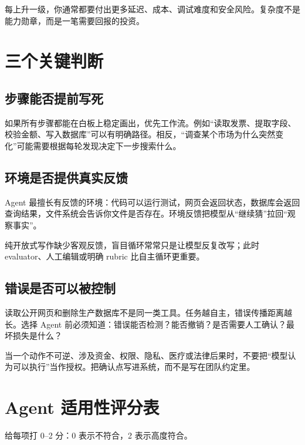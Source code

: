 每上升一级，你通常都要付出更多延迟、成本、调试难度和安全风险。复杂度不是能力勋章，而是一笔需要回报的投资。

\section{三个关键判断}

\subsection{步骤能否提前写死}

如果所有步骤都能在白板上稳定画出，优先工作流。例如“读取发票、提取字段、校验金额、写入数据库”可以有明确路径。相反，“调查某个市场为什么突然变化”可能需要根据每轮发现决定下一步搜索什么。

\subsection{环境是否提供真实反馈}

Agent 最擅长有反馈的环境：代码可以运行测试，网页会返回状态，数据库会返回查询结果，文件系统会告诉你文件是否存在。环境反馈把模型从“继续猜”拉回“观察事实”。

纯开放式写作缺少客观反馈，盲目循环常常只是让模型反复改写；此时 evaluator、人工编辑或明确 rubric 比自主循环更重要。

\subsection{错误是否可以被控制}

读取公开网页和删除生产数据库不是同一类工具。任务越自主，错误传播距离越长。选择 Agent 前必须知道：错误能否检测？能否撤销？是否需要人工确认？最坏损失是什么？

\begin{warningbox}
当一个动作不可逆、涉及资金、权限、隐私、医疗或法律后果时，不要把“模型认为可以执行”当作授权。把确认点写进系统，而不是写在团队约定里。
\end{warningbox}

\section{Agent 适用性评分表}

给每项打 0--2 分：0 表示不符合，2 表示高度符合。

